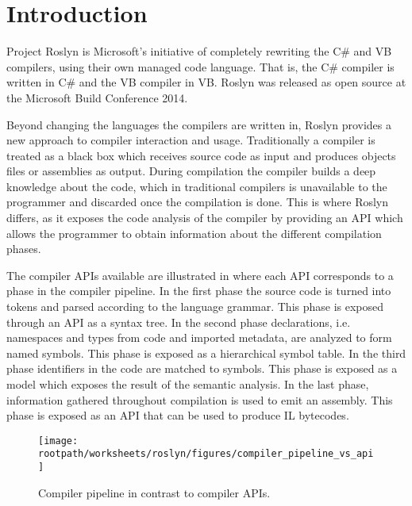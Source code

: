 \section{Introduction}\label{sec:intro}
Project Roslyn is Microsoft's initiative of completely rewriting the C\# and \ac{VB} compilers, using their own managed code language. That is, the C\# compiler is written in C\# and the \ac{VB} compiler in \ac{VB}. Roslyn was released as open source at the Microsoft Build Conference 2014\cite{csharpBuild}.

Beyond changing the languages the compilers are written in, Roslyn provides a new approach to compiler interaction and usage. Traditionally a compiler is treated as a black box which receives source code as input and produces objects files or assemblies as output\cite[p. 3]{ng2012roslyn}. During compilation the compiler builds a deep knowledge about the code, which in traditional compilers is unavailable to the programmer and discarded once the compilation is done. This is where Roslyn differs, as it exposes the code analysis of the compiler by providing an \ac{API} which allows the programmer to obtain information about the different compilation phases\cite[p. 3]{ng2012roslyn}. 

The compiler \acp{API} available are illustrated in  where each \ac{API} corresponds to a phase in the compiler pipeline. In the first phase the source code is turned into tokens and parsed according to the language grammar. This phase is exposed through an \ac{API} as a syntax tree. In the second phase declarations, i.e. namespaces and types from code and imported metadata, are analyzed to form named symbols. This phase is exposed as a hierarchical symbol table. In the third phase identifiers in the code are matched to symbols. This phase is exposed as a model which exposes the result of the semantic analysis. In the last phase, information gathered throughout compilation is used to emit an assembly. This phase is exposed as an \ac{API} that can be used to produce IL bytecodes\cite[p. 3-4]{ng2012roslyn}.

\begin{figure}[htbp]
\centering
 \texttt{[image: \\rootpath/worksheets/roslyn/figures/compiler\_pipeline\_vs\_api]} 
 \caption{Compiler pipeline in contrast to compiler \acp{API}\cite[p. 4]{ng2012roslyn}.}
\label{fig:api_vs_compiler_pipeline}
\end{figure}

